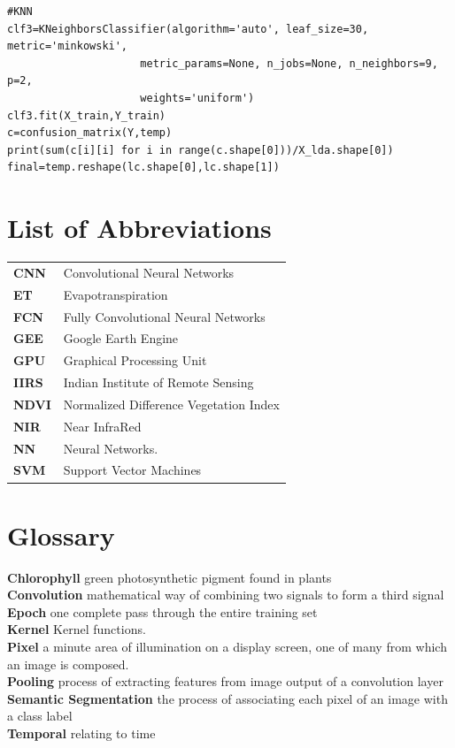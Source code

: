 \documentclass[12pt, a4paper]{report}
\begin{document}
\begin{verbatim}
#KNN
clf3=KNeighborsClassifier(algorithm='auto', leaf_size=30, metric='minkowski',
                     metric_params=None, n_jobs=None, n_neighbors=9, p=2,
                     weights='uniform')
clf3.fit(X_train,Y_train)
c=confusion_matrix(Y,temp)
print(sum(c[i][i] for i in range(c.shape[0]))/X_lda.shape[0])
final=temp.reshape(lc.shape[0],lc.shape[1])
\end{verbatim}


\printbibliography[heading=bibintoc, title={References}]

\setcounter{secnumdepth}{0}
\section*{List of Abbreviations}
\vspace*{0.5cm}
\begin{tabular}{p{} p{}}
\textbf{CNN} & Convolutional Neural Networks\\
\textbf{ET} & Evapotranspiration\\
\textbf{FCN} & Fully Convolutional Neural Networks\\
\textbf{GEE} & Google Earth Engine\\
\textbf{GPU} & Graphical Processing Unit\\
\textbf{IIRS} & Indian Institute of Remote Sensing\\
\textbf{NDVI} & Normalized Difference Vegetation Index\\
\textbf{NIR} & Near InfraRed\\
\textbf{NN} & Neural Networks.\\
\textbf{SVM} & Support Vector Machines\\
\end{tabular}
\vspace*{1cm}

\section*{Glossary}
\vspace*{0.5cm}
\textbf{Chlorophyll} green photosynthetic pigment found in plants\\
\textbf{Convolution} mathematical way of combining two signals to form a third signal\\
\textbf{Epoch} one complete pass through the entire training set\\
\textbf{Kernel} Kernel functions.\\
\textbf{Pixel} a minute area of illumination on a display screen, one of many from which an image is composed.\\
\textbf{Pooling} process of extracting features from image output of a convolution layer\\
\textbf{Semantic Segmentation} the process of associating each pixel of an image with a class label\\
\textbf{Temporal} relating to time\\
\end{document}
